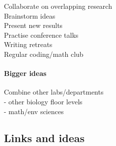 \documentclass[10,portrait]{article}
\let\oldparagraph\paragraph
\renewcommand{\paragraph}[1]{\oldparagraph{#1}\mbox{}}
\begin{document}
Collaborate on overlapping research\\
Brainstorm ideas\\
Present new results\\
Practise conference talks\\
Writing retreats\\
Regular coding/math club

\paragraph{Bigger ideas}\label{bigger-ideas}

Combine other labs/departments\\
- other biology floor levels\\
- math/env sciences

\newpage  

\subsection{Links and ideas}\label{links-and-ideas}

\printbibliography
\end{document}
